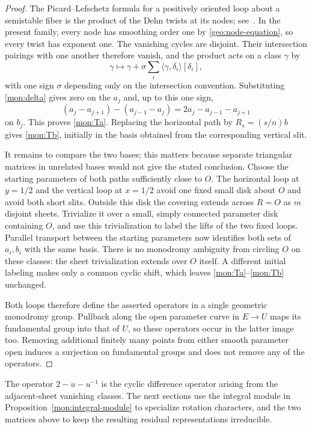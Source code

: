 \begin{proof}
The Picard--Lefschetz formula for a positively oriented loop about a
semistable fiber is the product of the Dehn twists at its nodes;
see~\cite[Expos\'e~XV]{SGA7II}.  In the present family, every node
has smoothing order one by \eqref{geo:node-equation}, so every twist
has exponent one.  The vanishing cycles are disjoint.  Their
intersection pairings with one another therefore vanish, and the
product acts on a class $\gamma$ by
\begin{equation}\label{mon:PL}
 \gamma\longmapsto
 \gamma+\sigma\sum_i
 \langle\gamma,\delta_i\rangle[\delta_i],
\end{equation}
with one sign $\sigma$ depending only on the intersection convention.
Substituting \eqref{mon:delta} gives zero on the $a_j$ and, up to this
one sign,
\[
 (a_j-a_{j+1})-(a_{j-1}-a_j)
   =2a_j-a_{j-1}-a_{j+1}
\]
on $b_j$.  This proves \eqref{mon:Ta}.  Replacing the horizontal
path by $R_s=(s/n)b$ gives \eqref{mon:Tb}, initially in the basis
obtained from the corresponding vertical slit.

It remains to compare the two bases; this matters because separate
triangular matrices in unrelated bases would not give the stated
conclusion.  Choose the starting parameters of both paths sufficiently
close to $O$.  The horizontal loop at $y=1/2$ and the vertical loop
at $x=1/2$ avoid one fixed small disk about $O$ and avoid both short
slits.  Outside this disk the covering extends across $R=O$ as $m$
disjoint sheets.  Trivialize it over a small, simply connected
parameter disk containing $O$, and use this trivialization to label
the lifts of the two fixed loops.  Parallel transport between the
starting parameters now identifies both sets of $a_i,b_i$ with the
same basis.  There is no monodromy ambiguity from circling $O$ on
these classes: the sheet trivialization extends over $O$ itself.
A different initial labeling makes only a common cyclic shift, which
leaves \eqref{mon:Ta}--\eqref{mon:Tb} unchanged.

Both loops therefore define the asserted operators in a single
geometric monodromy group.  Pullback along the open parameter curve
in $E\to U$ maps its fundamental group into that of $U$, so these
operators occur in the latter image too.  Removing additional finitely
many points from either smooth parameter open induces a surjection
on fundamental groups and does not remove any of the operators.
\end{proof}

The operator $2-u-u^{-1}$ is the cyclic difference operator arising
from the adjacent-sheet vanishing classes.  The next sections use
the integral module in Proposition~\ref{mon:integral-module} to
specialize rotation characters, and the two matrices above to keep
the resulting residual representations irreducible.
